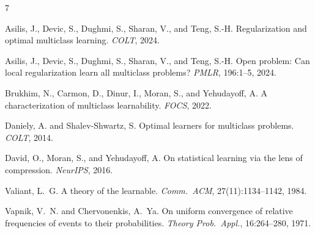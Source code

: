 \documentclass[final]{article}
\begin{document}
{\small

\begin{thebibliography}{7}

Asilis, J., Devic, S., Dughmi, S., Sharan, V., and Teng, S.-H.
\newblock Regularization and optimal multiclass learning.
\newblock \emph{COLT}, 2024.

Asilis, J., Devic, S., Dughmi, S., Sharan, V., and Teng, S.-H.
\newblock Open problem: Can local regularization learn all multiclass problems?
\newblock \emph{PMLR}, 196:1--5, 2024.

Brukhim, N., Carmon, D., Dinur, I., Moran, S., and Yehudayoff, A.
\newblock A characterization of multiclass learnability.
\newblock \emph{FOCS}, 2022.

Daniely, A. and Shalev-Shwartz, S.
\newblock Optimal learners for multiclass problems.
\newblock \emph{COLT}, 2014.

David, O., Moran, S., and Yehudayoff, A.
\newblock On statistical learning via the lens of compression.
\newblock \emph{NeurIPS}, 2016.

Valiant, L.~G.
\newblock A theory of the learnable.
\newblock \emph{Comm.\ ACM}, 27(11):1134--1142, 1984.

Vapnik, V.~N. and Chervonenkis, A.~Ya.
\newblock On uniform convergence of relative frequencies of events to their probabilities.
\newblock \emph{Theory Prob.\ Appl.}, 16:264--280, 1971.

\end{thebibliography}
}
\end{document}
